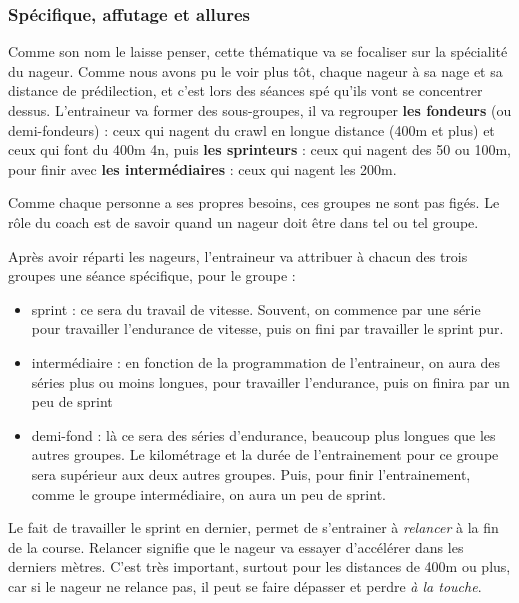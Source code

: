 \subsubsection{Spécifique, affutage et allures}\label{spe}

Comme son nom le laisse penser, cette thématique va se focaliser sur la spécialité du nageur. Comme nous avons pu le voir plus tôt, chaque nageur à sa nage et sa distance de prédilection, et c'est lors des séances spé qu'ils vont se concentrer dessus. L'entraineur va former des sous-groupes, il va regrouper \textbf{les fondeurs} (ou demi-fondeurs) : ceux qui nagent du crawl en longue distance (400m et plus) et ceux qui font du 400m 4n, puis \textbf{les sprinteurs} : ceux qui nagent des 50 ou 100m, pour finir avec \textbf{les intermédiaires} : ceux qui nagent les 200m.

Comme chaque personne a ses propres besoins, ces groupes ne sont pas figés. Le rôle du coach est de savoir quand un nageur doit être dans tel ou tel groupe.

\vspace{12pt}

Après avoir réparti les nageurs, l'entraineur va attribuer à chacun des trois groupes une séance spécifique, pour le groupe :

\begin{itemize}
\item sprint : ce sera du travail de vitesse. Souvent, on commence par une série pour travailler l'endurance de vitesse, puis on fini par travailler le sprint pur.
\item intermédiaire : en fonction de la programmation de l'entraineur, on aura des séries plus ou moins longues, pour travailler l'endurance, puis on finira par un peu de sprint
\item demi-fond : là ce sera des séries d'endurance, beaucoup plus longues que les autres groupes. Le kilométrage et la durée de l'entrainement pour ce groupe sera supérieur aux deux autres groupes. Puis, pour finir l'entrainement, comme le groupe intermédiaire, on aura un peu de sprint.
\end{itemize}

\vspace{12pt}

Le fait de travailler le sprint en dernier, permet de s'entrainer à \textit{relancer} à la fin de la course. Relancer signifie que le nageur va essayer d'accélérer dans les derniers mètres. C'est très important, surtout pour les distances de 400m ou plus, car si le nageur ne relance pas, il peut se faire dépasser et perdre \textit{à la touche}.

